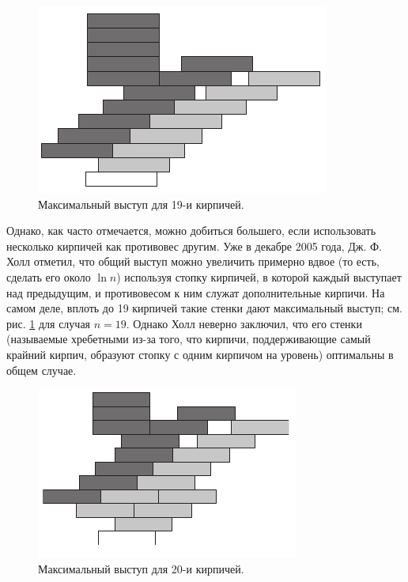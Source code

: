 \begin{figure}[htb!]
\centering
\includegraphics[scale=1]{pics/kirpich2}
\caption{Максимальный выступ для 19-и кирпичей.}
\label{pic:kirpich2}
\end{figure}

Однако, как часто отмечается, можно добиться большего, если использовать несколько кирпичей как противовес другим.
Уже в декабре 2005 года, Дж. Ф. Холл \cite{35} отметил, что общий выступ можно увеличить примерно вдвое (то есть, сделать его около $\ln n$) используя стопку кирпичей, в которой каждый выступает над предыдущим, и противовесом к ним служат дополнительные кирпичи. %
На самом деле, вплоть до 19 кирпичей такие стенки дают максимальный выступ; см. рис. \ref{pic:kirpich2} для случая $n = 19$.
Однако Холл неверно заключил, что его стенки (называемые хребетными из-за того, что кирпичи, поддерживающие самый крайний кирпич, образуют стопку с одним кирпичом на уровень) оптимальны в общем случае.

\begin{figure}[htb!]
\centering
\includegraphics[scale=1]{pics/kirpich3}
\caption{Максимальный выступ для 20-и кирпичей.}
\label{pic:kirpich3}
\end{figure}

